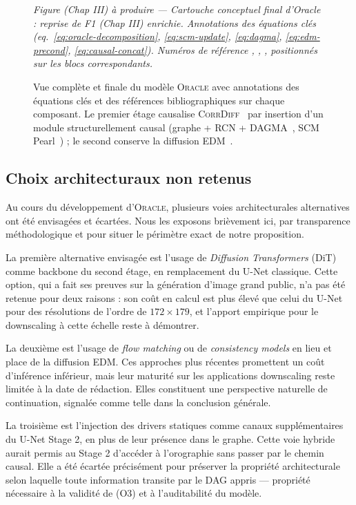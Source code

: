 \documentclass[14pt,a4paper,openany]{extreport}
\theoremstyle{definition}
\newcommand{\Oracle}{\textsc{Oracle}}
\newcommand{\CorrDiff}{\textsc{CorrDiff}}
\newcommand{\figplaceholder}[2][0.9\linewidth]{%
  \begin{tcolorbox}[width=#1,height=5cm,valign=center,colback=gray!8,colframe=gray!45,arc=2pt,boxrule=0.5pt]
    \centering\small\textit{#2}
  \end{tcolorbox}%
}
\begin{document}
\begin{figure}[ht]
  \centering
  \figplaceholder{Figure (Chap III) à produire --- Cartouche conceptuel final d'Oracle : reprise de F1 (Chap III) enrichie. Annotations des équations clés (eq.~\ref{eq:oracle-decomposition}, \ref{eq:scm-update}, \ref{eq:dagma}, \ref{eq:edm-precond}, \ref{eq:causal-concat}). Numéros de référence \cite{mardani_corrdiff_2023}, \cite{karras_edm_2022}, \cite{bello_dagma_2022}, \cite{pearl_causality_2009} positionnés sur les blocs correspondants.}
  \caption{Vue complète et finale du modèle \Oracle{} avec annotations des équations clés et des références bibliographiques sur chaque composant. Le premier étage causalise \CorrDiff{}~\cite{mardani_corrdiff_2023} par insertion d'un module structurellement causal (graphe + RCN + DAGMA~\cite{bello_dagma_2022}, SCM Pearl~\cite{pearl_causality_2009}) ; le second conserve la diffusion EDM~\cite{karras_edm_2022}.}
  \label{fig:oracle-final}
\end{figure}

\subsection{Choix architecturaux non retenus}
\label{ssec:oracle-non-retenus}

Au cours du développement d'\Oracle{}, plusieurs voies architecturales alternatives ont été envisagées et écartées. Nous les exposons brièvement ici, par transparence méthodologique et pour situer le périmètre exact de notre proposition.

La première alternative envisagée est l'usage de \emph{Diffusion Transformers} (DiT) comme backbone du second étage, en remplacement du U-Net classique. Cette option, qui a fait ses preuves sur la génération d'image grand public, n'a pas été retenue pour deux raisons : son coût en calcul est plus élevé que celui du U-Net pour des résolutions de l'ordre de $172 \times 179$, et l'apport empirique pour le downscaling à cette échelle reste à démontrer.

La deuxième est l'usage de \emph{flow matching} ou de \emph{consistency models} en lieu et place de la diffusion EDM. Ces approches plus récentes promettent un coût d'inférence inférieur, mais leur maturité sur les applications downscaling reste limitée à la date de rédaction. Elles constituent une perspective naturelle de continuation, signalée comme telle dans la conclusion générale.

La troisième est l'injection des drivers statiques comme canaux supplémentaires du U-Net Stage 2, en plus de leur présence dans le graphe. Cette voie hybride aurait permis au Stage 2 d'accéder à l'orographie sans passer par le chemin causal. Elle a été écartée précisément pour préserver la propriété architecturale selon laquelle toute information transite par le DAG appris --- propriété nécessaire à la validité de (O3) et à l'auditabilité du modèle.
\end{document}
